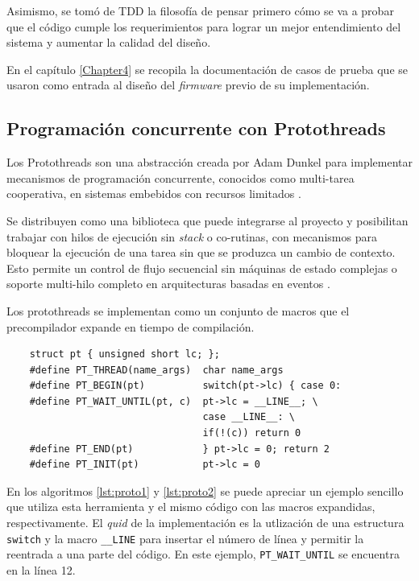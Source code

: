 Asimismo, se tomó de TDD la filosofía de pensar primero cómo se va a probar que el código cumple los requerimientos para lograr un mejor entendimiento del sistema y aumentar la calidad del diseño.

En el capítulo \ref{Chapter4} se recopila la documentación de casos de prueba que se usaron como entrada al diseño del \textit{firmware} previo de su implementación.

\subsection{Programación concurrente con Protothreads} 
\label{subsec:protothreads}

Los Protothreads son una abstracción creada por Adam Dunkel para implementar mecanismos de programación concurrente, conocidos como multi-tarea cooperativa, en sistemas embebidos con recursos limitados \citep{Protothreads}. 

Se distribuyen como una biblioteca que puede integrarse al proyecto y posibilitan trabajar con hilos de ejecución sin \textit{stack} o co-rutinas, con mecanismos para bloquear la ejecución de una tarea sin que se produzca un cambio de contexto.  Esto permite un control de flujo secuencial sin máquinas de estado complejas o soporte multi-hilo completo en arquitecturas basadas en eventos \citep{dunkels06protothreads} \citep{dunkels05using}. 

Los protothreads se implementan como un conjunto de macros que el precompilador expande en tiempo de compilación.  

\begin{verbatim}
	struct pt { unsigned short lc; };
	#define PT_THREAD(name_args)  char name_args
	#define PT_BEGIN(pt)          switch(pt->lc) { case 0:
	#define PT_WAIT_UNTIL(pt, c)  pt->lc = __LINE__; \
	                              case __LINE__: \
	                              if(!(c)) return 0
	#define PT_END(pt)            } pt->lc = 0; return 2
	#define PT_INIT(pt)           pt->lc = 0
\end{verbatim}

En los algoritmos \ref{lst:proto1} y \ref{lst:proto2} se puede apreciar un ejemplo sencillo que utiliza esta herramienta y el mismo código con las macros expandidas, respectivamente. El \textit{quid} de la implementación es la utlización de una estructura \texttt{switch} y la macro \texttt{\_\_LINE} para insertar el número de línea y permitir la reentrada a una parte del código. En este ejemplo, \texttt{PT\_WAIT\_UNTIL} se encuentra en la línea 12.

